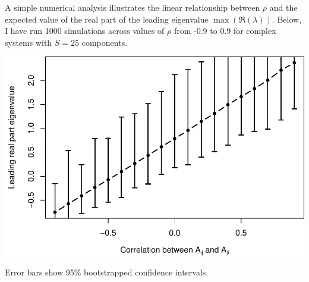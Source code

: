 \documentclass[]{article}
\begin{document}
A simple numerical analysis illustrates the linear relationship between
\(\rho\) and the expected value of the real part of the leading
eigenvalue \(\max(\Re(\lambda))\). Below, I have run 1000 simulations
across values of \(\rho\) from -0.9 to 0.9 for complex systems with
\(S = 25\) components.

\includegraphics{revision_notes_files/figure-latex/unnamed-chunk-4-1.pdf}

Error bars show 95\% bootstrapped confidence intervals.
\end{document}
